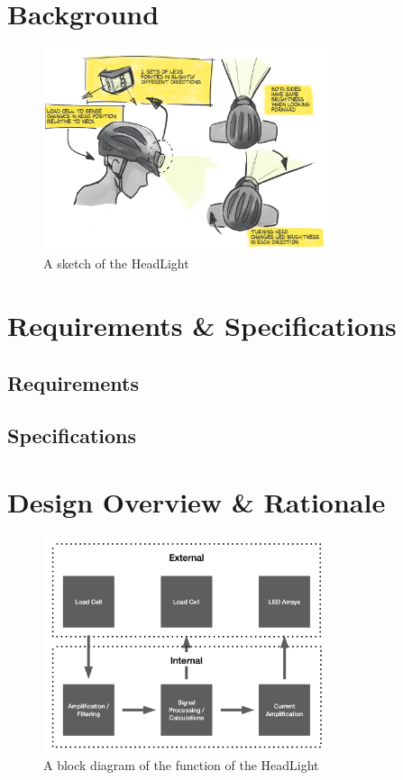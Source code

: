 \documentclass[twoside]{article}
\begin{document}
\section{Background}
    \noindent
    \begin{figure}[H]
        \centering
        \includegraphics[width=0.75\textwidth]{headlamp-project-concept.png}
        \caption{A sketch of the HeadLight}
        \label{fig:sketch}
    \end{figure}

\section{Requirements \& Specifications}
    \subsection{Requirements}
    \subsection{Specifications}

\section{Design Overview \& Rationale}
    \noindent
    \begin{figure}[H]
        \centering
        \includegraphics[width=0.75\textwidth]{block_diagram.png}
        \caption{A block diagram of the function of the HeadLight}
        \label{fig:block}
    \end{figure}
\end{document}
